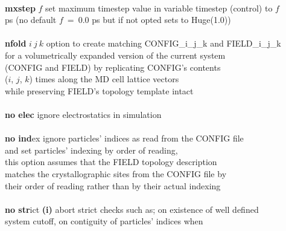\begin{tabbing}
\>                                              \> \\
\> {\bf mxstep} $f$                             \> set maximum timestep value in variable timestep (control) to $f$ \\
\>                                              \> ps (no default $f~=~0.0$ ps but if not opted sets to Huge(1.0)) \\
\>                                              \> \\
\> {\bf nfold} $i~j~k$                          \> option to create matching CONFIG\_i\_j\_k and FIELD\_i\_j\_k \\
\>                                              \> for a volumetrically expanded version of the current system \\
\>                                              \> (CONFIG and FIELD) by replicating CONFIG's contents \\
\>                                              \> ($i$, $j$, $k$) times along the MD cell lattice vectors \\
\>                                              \> while preserving FIELD's topology template intact \\
\>                                              \> \\
\> {\bf no elec}                                \> ignore electrostatics in simulation \\
\>                                              \> \\
\> {\bf no ind}ex                               \> ignore particles' indices as read from the CONFIG file \\
\>                                              \> and set particles' indexing by order of reading, \\
\>                                              \> this option assumes that the FIELD topology description \\
\>                                              \> matches the crystallographic sites from the CONFIG file by \\
\>                                              \> their order of reading rather than by their actual indexing \\
\>                                              \> \\
\> {\bf no str}ict                              \> {\bf (i)} abort strict checks such as; on existence of well defined \\
\>                                              \> system cutoff, on contiguity of particles' indices when \\

\end{tabbing}
